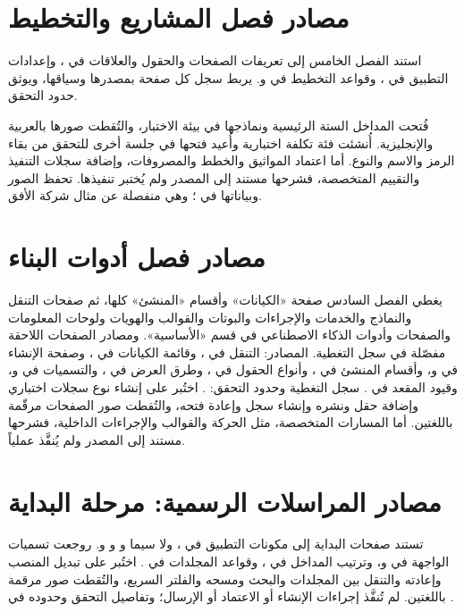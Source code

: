 \section{مصادر فصل المشاريع والتخطيط}
\label{sec:sources-projects}
استند الفصل الخامس إلى تعريفات الصفحات والحقول والعلاقات في ، وإعدادات التطبيق في ، وقواعد التخطيط في  و. يربط سجل  كل صفحة بمصدرها وسياقها، ويوثق  حدود التحقق.

فُتحت المداخل الستة الرئيسية ونماذجها في بيئة الاختبار، والتُقطت صورها بالعربية والإنجليزية. أُنشئت فئة تكلفة اختبارية وأُعيد فتحها في جلسة أخرى للتحقق من بقاء الرمز والاسم والنوع. أما اعتماد المواثيق والخطط والمصروفات، وإضافة سجلات التنفيذ والتقييم المتخصصة، فشرحها مستند إلى المصدر ولم يُختبر تنفيذها. تحفظ الصور وبياناتها في ؛ وهي منفصلة عن مثال شركة الأفق.

\section{مصادر فصل أدوات البناء}
\label{sec:sources-builder}
يغطي الفصل السادس صفحة «الكيانات» وأقسام «المنشئ» كلها، ثم صفحات التنقل والنماذج والخدمات والإجراءات والبوتات والقوالب والهويات ولوحات المعلومات والصفحات وأدوات الذكاء الاصطناعي في قسم «الأساسية». ومصادر الصفحات اللاحقة مفصّلة في سجل التغطية. المصادر: التنقل في ، وقائمة الكيانات في ، وصفحة الإنشاء في  و، وأقسام المنشئ في ، وأنواع الحقول في ، وطرق العرض في ، والتسميات في  و، وقيود المقعد في . سجل التغطية وحدود التحقق: .
اختُبر على  إنشاء نوع سجلات اختباري وإضافة حقل ونشره وإنشاء سجل وإعادة فتحه، والتُقطت صور الصفحات مرقّمة باللغتين. أما المسارات المتخصصة، مثل الحركة والقوالب والإجراءات الداخلية، فشرحها مستند إلى المصدر ولم يُنفَّذ عملياً.

\section{مصادر المراسلات الرسمية: مرحلة البداية}
\label{sec:sources-correspondence}
تستند صفحات البداية إلى مكونات التطبيق في ، ولا سيما  و و و. روجعت تسميات الواجهة في  و، وترتيب المداخل في ، وقواعد المجلدات في .
اختُبر على  تبديل المنصب وإعادته والتنقل بين المجلدات والبحث ومسحه والفلتر السريع، والتُقطت صور مرقمة باللغتين. لم تُنفَّذ إجراءات الإنشاء أو الاعتماد أو الإرسال؛ وتفاصيل التحقق وحدوده في .

